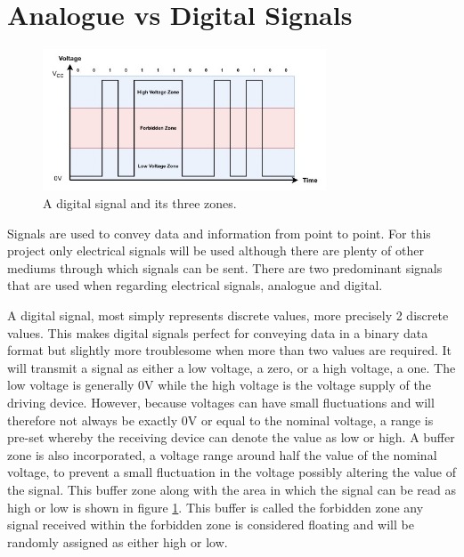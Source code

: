 \section{Analogue vs Digital Signals}
\begin{figure}
	\begin{center}
		\includegraphics[width = 0.75\textwidth]{figures/DigitalSignal.jpg}
		\caption{A digital signal and its three zones.}
		\label{fig:2:digital}
	\end{center}
\end{figure}
Signals are used to convey data and information from point to point. For this project only electrical signals will be used although there are plenty of other mediums through which signals can be sent. There are two predominant signals that are used when regarding electrical signals, analogue and digital. \par
\vspace{0.6cm}
A digital signal, most simply represents discrete values, more precisely 2 discrete values. This makes digital signals perfect for conveying data in a binary data format but slightly more troublesome when more than two values are required. It will transmit a signal as either a low voltage, a zero, or a high voltage, a one. The low voltage is generally 0V while the high voltage is the voltage supply of the driving device. However, because voltages can have small fluctuations and will therefore not always be exactly 0V or equal to the nominal voltage, a range is pre-set whereby the receiving device can denote the value as low or high. A buffer zone is also incorporated, a voltage range around half the value of the nominal voltage, to prevent a small fluctuation in the voltage possibly altering the value of the signal. This buffer zone along with the area in which the signal can be read as high or low is shown in figure \ref{fig:2:digital}. This buffer is called the forbidden zone any signal received within the forbidden zone is considered floating and will be randomly assigned as either high or low.\par
